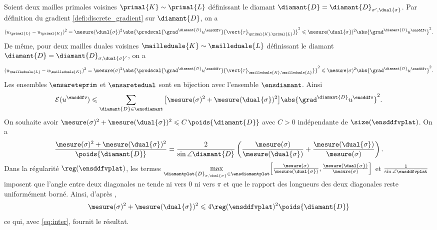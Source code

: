 \begin{demo}
Soient deux mailles primales voisines $\primal{K} \sim \primal{L}$ définissant le diamant $\diamant{D} = \diamant{D}_{\sigma', \dual{\sigma}}$. Par définition du gradient \ref{defi:discrete_gradient} sur $\diamant{D}$, on a
\begin{equation*}
    (u_{\primal{L}} - u_{\primal{K}})^2 
    = \mesure(\dual{\sigma})^2 \abs{\prodscal{\grad^{\diamant{D}} u^\ensddfv}{\vect{\tau}_{\primal{K},\primal{L}}}}^2
    \leqslant \mesure(\dual{\sigma})^2 \abs{\grad^{\diamant{D}} u^\ensddfv}^2.
\end{equation*}
De même, pour deux mailles duales voisines $\mailleduale{K} \sim \mailleduale{L}$ définissant le diamant $\diamant{D} = \diamant{D}_{\sigma,\dual{\sigma}'}$, on a
\begin{equation*}
    (u_{\mailleduale{L}} - u_{\mailleduale{K}})^2 
    = \mesure(\sigma)^2 \abs{\prodscal{\grad^{\diamant{D}} u^\ensddfv}{\vect{\tau}_{\mailleduale{K},\mailleduale{L}}}}^2
    \leqslant \mesure(\sigma)^2 \abs{\grad^{\diamant{D}} u^\ensddfv}^2.
\end{equation*}
Les ensembles $\ensareteprim$ et $\ensaretedual$ sont en bijection avec l'ensemble $\ensdiamant$. Ainsi
\begin{equation} \label{eq:inter}
\mathcal{E}(u^\ensddfv)
\leqslant
\sum_{\diamant{D} \in \ensdiamant} \big[\mesure(\sigma)^2 + \mesure(\dual{\sigma})^2\big] \abs{\grad^{\diamant{D}} u^\ensddfv}^2.
\end{equation}
On souhaite avoir $\mesure(\sigma)^2 + \mesure(\dual{\sigma})^2 \leqslant C \, \poids{\diamant{D}}$ avec $C > 0$ indépendante de $\size(\ensddfvplat)$. On a 
\begin{equation} \label{eq:rapport}
\frac{
    \mesure(\sigma)^2 + \mesure(\dual{\sigma})^2 
}{
    \poids{\diamant{D}}
}
=
\frac{2}{\sin \angle{\diamant{D}}}
\left(
    \frac{\mesure(\sigma)}{\mesure(\dual{\sigma})}
    +
    \frac{\mesure(\dual{\sigma})}{\mesure(\sigma)}
\right).
\end{equation}
Dans la régularité $\reg(\ensddfvplat)$, les termes $\max\limits_{\diamantplat{D}_{\sigma, \dual{\sigma}} \in \ensdiamantplat}\mathopen{}\left[
    \frac{\mesure(\sigma)}{\mesure(\dual{\sigma})},
    \frac{\mesure(\dual{\sigma})}{\mesure(\sigma)}
\right]$ et $\frac{1}{\sin \angle{\ensddfvplat}}$ imposent que l'angle entre deux diagonales ne tende ni vers $0$ ni vers $\pi$ et que le rapport des longueurs des deux diagonales reste uniformément borné. Ainsi, d'après , 
\begin{align*}
\mesure(\sigma)^2 + \mesure(\dual{\sigma})^2 
\leqslant
4 \reg(\ensddfvplat)^2 \poids{\diamant{D}}
\end{align*}
ce qui, avec \ref{eq:inter}, fournit le résultat.
\end{demo}

